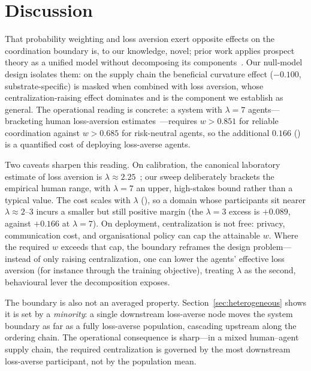 \documentclass[letterpaper]{article}
\theoremstyle{plain}
\begin{document}
\section{Discussion}
\label{sec:discussion}

That probability weighting and loss aversion exert opposite effects on the
coordination boundary is, to our knowledge, novel; prior work applies prospect
theory as a unified model without decomposing its
components~\citep{lalmohammed2025,ghaemi2024risk}. Our null-model design isolates
them: on the supply chain the beneficial curvature effect ($-0.100$,
substrate-specific) is masked when combined with loss aversion, whose
centralization-raising effect dominates and is the component we establish as
general. The operational reading is concrete: a system with $\lambda{=}7$
agents---bracketing human loss-aversion estimates~\citep{tversky1992}---requires
$w>0.851$ for reliable coordination against $w>0.685$ for risk-neutral agents,
so the additional $0.166$ () is a quantified cost of
deploying loss-averse agents.

Two caveats sharpen this reading. On calibration, the canonical laboratory
estimate of loss aversion is $\lambda\approx2.25$~\citep{tversky1992}; our
sweep deliberately brackets the empirical human range, with $\lambda{=}7$ an
upper, high-stakes bound rather than a typical value. The cost scales with
$\lambda$ (), so a domain whose participants sit nearer
$\lambda\approx2$--$3$ incurs a smaller but still positive margin (the
$\lambda{=}3$ excess is $+0.089$, against $+0.166$ at $\lambda{=}7$). On
deployment, centralization is not free: privacy, communication cost, and
organisational policy can cap the attainable $w$. Where the required $w$
exceeds that cap, the boundary reframes the design problem---instead of only
raising centralization, one can lower the agents' effective loss aversion
(for instance through the training objective), treating $\lambda$ as the
second, behavioural lever the decomposition exposes.

The boundary is also not an averaged property. Section~\ref{sec:heterogeneous}
shows it is set by a \emph{minority}: a single downstream loss-averse node
moves the system boundary as far as a fully loss-averse population, cascading
upstream along the ordering chain. The operational consequence is sharp---in a
mixed human--agent supply chain, the required centralization is governed by the
most downstream loss-averse participant, not by the population mean.
\end{document}

